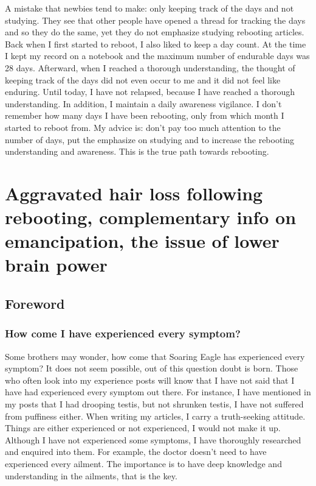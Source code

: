 \documentclass[
]{book}
\begin{document}
A mistake that newbies tend to make: only keeping track of the days and not studying. They see that other people have opened a thread for tracking the days and so they do the same, yet they do not emphasize studying rebooting articles. Back when I first started to reboot, I also liked to keep a day count. At the time I kept my record on a notebook and the maximum number of endurable days was 28 days. Afterward, when I reached a thorough understanding, the thought of keeping track of the days did not even occur to me and it did not feel like enduring. Until today, I have not relapsed, because I have reached a thorough understanding. In addition, I maintain a daily awareness vigilance. I don't remember how many days I have been rebooting, only from which month I started to reboot from. My advice is: don't pay too much attention to the number of days, put the emphasize on studying and to increase the rebooting understanding and awareness. This is the true path towards rebooting.

\hypertarget{aggravated-hair-loss-following-rebooting-complementary-info-on-emancipation-the-issue-of-lower-brain-power}{%
\chapter{Aggravated hair loss following rebooting, complementary info on emancipation, the issue of lower brain power}\label{aggravated-hair-loss-following-rebooting-complementary-info-on-emancipation-the-issue-of-lower-brain-power}}

\hypertarget{foreword-4}{%
\section{Foreword}\label{foreword-4}}

\hypertarget{how-come-i-have-experienced-every-symptom}{%
\subsection{How come I have experienced every symptom?}\label{how-come-i-have-experienced-every-symptom}}

Some brothers may wonder, how come that Soaring Eagle has experienced every symptom? It does not seem possible, out of this question doubt is born. Those who often look into my experience posts will know that I have not said that I have had experienced every symptom out there. For instance, I have mentioned in my posts that I had drooping testis, but not shrunken testis, I have not suffered from puffiness either. When writing my articles, I carry a truth-seeking attitude. Things are either experienced or not experienced, I would not make it up. Although I have not experienced some symptoms, I have thoroughly researched and enquired into them. For example, the doctor doesn't need to have experienced every ailment. The importance is to have deep knowledge and understanding in the ailments, that is the key.
\end{document}
